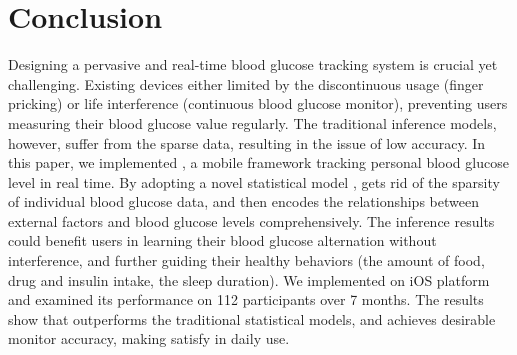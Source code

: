 
\section{Conclusion}
\label{sec:conclusion}

Designing a pervasive and real-time blood glucose tracking system is crucial yet challenging. Existing devices either limited by the discontinuous usage (\eg finger pricking) or life interference (\ie continuous blood glucose monitor), preventing users measuring their blood glucose value regularly.
The traditional inference models, however, suffer from the sparse data, resulting in the issue of low accuracy.
In this paper, we implemented \sysname, a mobile framework tracking personal blood glucose level in real time.
By adopting a novel statistical model \modelname, \sysname gets rid
of the sparsity of individual blood glucose data, and then encodes the relationships between external factors and blood glucose levels comprehensively. The inference results could benefit users in learning their
blood glucose alternation without interference, and further guiding their healthy behaviors (\eg the amount of food, drug and insulin intake, the sleep duration). We implemented \sysname on iOS platform and examined its performance on 112 participants over 7 months. The results show that \modelname outperforms the traditional statistical models, and achieves desirable monitor accuracy, making \sysname satisfy in daily use.
